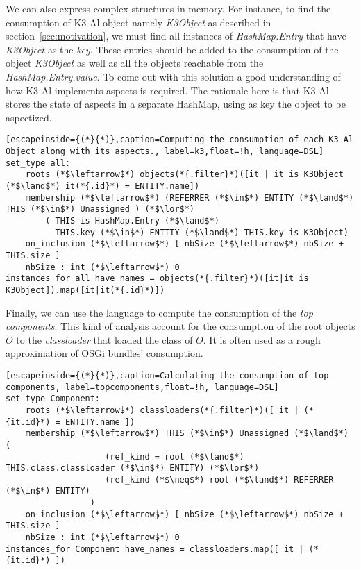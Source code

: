 We can also express complex structures in memory.
For instance, to find the consumption of K3-Al object namely \textit{K3Object} as described in section~\ref{sec:motivation}, we must find all instances of \textit{HashMap.Entry} that have \textit{K3Object} as the \textit{key}. These entries should be added to the consumption of the object \textit{K3Object} as well as all the objects reachable from the \textit{HashMap.Entry.value}.
To come out with this solution a good understanding of how K3-Al implements aspects is required.
The rationale here is that K3-Al stores the state of aspects in a separate HashMap, using as key the object to be aspectized.
\begin{lstlisting}[escapeinside={(*}{*)},caption=Computing the consumption of each K3-Al Object along with its aspects., label=k3,float=!h, language=DSL]
set_type all: 
	roots (*$\leftarrow$*) objects(*{.filter}*)([it | it is K3Object (*$\land$*) it(*{.id}*) = ENTITY.name])
 	membership (*$\leftarrow$*) (REFERRER (*$\in$*) ENTITY (*$\land$*) THIS (*$\in$*) Unassigned ) (*$\lor$*)
		( THIS is HashMap.Entry (*$\land$*) 
		  THIS.key (*$\in$*) ENTITY (*$\land$*) THIS.key is K3Object)
	on_inclusion (*$\leftarrow$*) [ nbSize (*$\leftarrow$*) nbSize + THIS.size ]
 	nbSize : int (*$\leftarrow$*) 0 
instances_for all have_names = objects(*{.filter}*)([it|it is K3Object]).map([it|it(*{.id}*)]) 
\end{lstlisting}

Finally, we can use the language to compute the consumption of the \textit{top components}. This kind of analysis account for the consumption of the root objects $O$ to the \textit{classloader} that loaded the class of $ O $. It is often used as a rough approximation of OSGi bundles' consumption. 

\begin{lstlisting}[escapeinside={(*}{*)},caption=Calculating the consumption of top components, label=topcomponents,float=!h, language=DSL]
set_type Component: 
	roots (*$\leftarrow$*) classloaders(*{.filter}*)([ it | (*{it.id}*) = ENTITY.name ])  
	membership (*$\leftarrow$*) THIS (*$\in$*) Unassigned (*$\land$*) (
					(ref_kind = root (*$\land$*) THIS.class.classloader (*$\in$*) ENTITY) (*$\lor$*)
					(ref_kind (*$\neq$*) root (*$\land$*) REFERRER (*$\in$*) ENTITY)
				 )
	on_inclusion (*$\leftarrow$*) [ nbSize (*$\leftarrow$*) nbSize + THIS.size ]
	nbSize : int (*$\leftarrow$*) 0
instances_for Component have_names = classloaders.map([ it | (*{it.id}*) ])  
\end{lstlisting}
